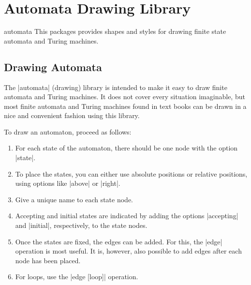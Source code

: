 %
%
%


\section{Automata Drawing Library}

\begin{tikzlibrary}{automata}
    This packages provides shapes and styles for drawing finite state automata
    and Turing machines.
\end{tikzlibrary}


\subsection{Drawing Automata}

The |automata| (drawing) library is intended to make it easy to draw finite
automata and Turing machines. It does not cover every situation imaginable, but
most finite automata and Turing machines found in text books can be drawn in a
nice and convenient fashion using this library.

To draw an automaton, proceed as follows:
%
\begin{enumerate}
    \item For each state of the automaton, there should be one node with the
        option |state|.
    \item To place the states, you can either use absolute positions or
        relative positions, using options like |above| or |right|.
    \item Give a unique name to each state node.
    \item Accepting and initial states are indicated by adding the options
        |accepting| and |initial|, respectively, to the state nodes.
    \item Once the states are fixed, the edges can be added. For this, the
        |edge| operation is most useful. It is, however, also possible to add
        edges after each node has been placed.
    \item For loops, use the |edge [loop]| operation.
\end{enumerate}

